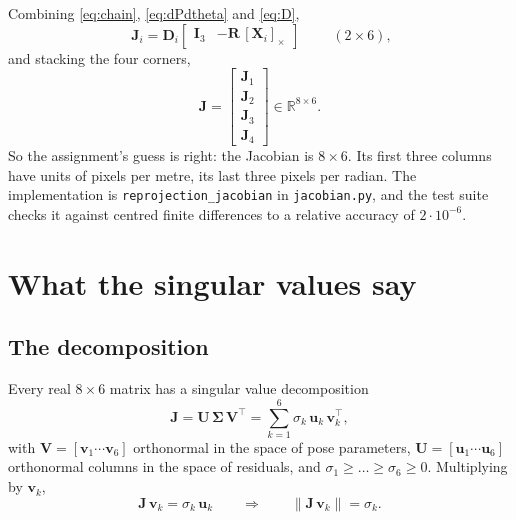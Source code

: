 \documentclass[11pt,a4paper]{article}
\theoremstyle{remark}
\newcommand{\Rset}{\mathbb{R}}
\newcommand{\Rmat}{\mathbf{R}}
\newcommand{\Jmat}{\mathbf{J}}
\newcommand{\Dmat}{\mathbf{D}}
\newcommand{\Umat}{\mathbf{U}}
\newcommand{\Vmat}{\mathbf{V}}
\newcommand{\Sigmat}{\boldsymbol{\Sigma}}
\newcommand{\Idm}{\mathbf{I}}
\newcommand{\uvec}{\mathbf{u}}
\newcommand{\vvec}{\mathbf{v}}
\newcommand{\Xvec}{\mathbf{X}}
\newcommand{\skewm}[1]{[#1]_{\times}}
\begin{document}
Combining \eqref{eq:chain}, \eqref{eq:dPdtheta} and \eqref{eq:D},
\begin{equation}
  \boxed{\;
  \Jmat_i = \Dmat_i
  \begin{bmatrix} \Idm_3 & -\Rmat\,\skewm{\Xvec_i} \end{bmatrix}
  \;}
  \qquad (2\times6),
  \label{eq:Ji}
\end{equation}
and stacking the four corners,
\begin{equation}
  \Jmat = \begin{bmatrix} \Jmat_1 \\ \Jmat_2 \\ \Jmat_3 \\ \Jmat_4 \end{bmatrix}
  \in \Rset^{8\times6}.
  \label{eq:J}
\end{equation}
So the assignment's guess is right: the Jacobian is $8\times6$. Its first three
columns have units of pixels per metre, its last three pixels per radian. The
implementation is \texttt{reprojection\_jacobian} in \texttt{jacobian.py}, and
the test suite checks it against centred finite differences to a relative
accuracy of $2\cdot10^{-6}$.

\section{What the singular values say}
\label{sec:svd}

\subsection{The decomposition}

Every real $8\times6$ matrix has a singular value decomposition
\begin{equation}
  \Jmat = \Umat\,\Sigmat\,\Vmat^{\top}
  = \sum_{k=1}^{6} \sigma_k\,\uvec_k\,\vvec_k^{\top},
  \label{eq:svd}
\end{equation}
with $\Vmat = [\vvec_1\cdots\vvec_6]$ orthonormal in the space of pose
parameters, $\Umat = [\uvec_1\cdots\uvec_6]$ orthonormal columns in the space of
residuals, and $\sigma_1 \ge \dots \ge \sigma_6 \ge 0$. Multiplying by
$\vvec_k$,
\begin{equation}
  \Jmat\,\vvec_k = \sigma_k\,\uvec_k
  \qquad\Longrightarrow\qquad
  \|\Jmat\,\vvec_k\| = \sigma_k .
  \label{eq:Jvk}
\end{equation}
\end{document}
